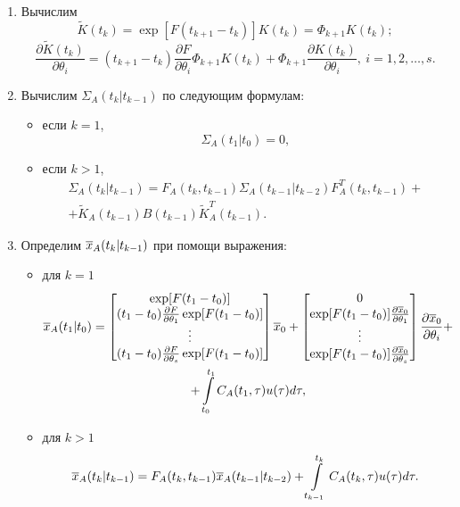 \documentclass[a4paper,14pt]{extarticle}
\newcommand{\pd}[2]{\frac{\partial #1}{\partial #2}}
\begin{document}
\begin{enumerate}
\item Вычислим
\[
	\tilde{K}(t_k) = \exp \left[ F(t_{k+1} - t_k) \right] K(t_k) = \Phi_{k+1}
		K(t_k);
\]
\[
	\pd{\tilde{K}(t_k)}{\theta_i} = (t_{k+1} - t_k) \pd{F}{\theta_i} \Phi_{k+1}
		K(t_k) + \Phi_{k+1} \pd{K(t_k)}{\theta_i},\ i = 1, 2, \ldots, s.
\]

\item Вычислим $\Sigma_A(t_k|t_{k-1})$ по следующим формулам:
	\begin{itemize}
		\item если $k = 1$,
			\[
				\Sigma_A(t_1|t_0) = 0,
			\]
		\item если $k > 1$,
			\begin{multline*}
				\Sigma_A(t_k|t_{k-1}) = F_A(t_k, t_{k-1}) \Sigma_A(t_{k-1}|t_{k-2})
					F_A^T(t_k, t_{k-1}) + \\ + \tilde{K}_A(t_{k-1}) B(t_{k-1})
					\tilde{K}_A^T(t_{k-1}).
			\end{multline*}
	\end{itemize}

\item Определим $\overline{x}_A(t_k|t_{k-1})$ при помощи выражения:
	\begin{itemize}
		\item для $k = 1$
			\begin{multline*}
				\ol{x}_A(t_1|t_{0}) =
				\begin{bmatrix}
					\exp[ F(t_1 - t_0) ] \\
					(t_1 - t_0) \pd{F}{\theta_1} \exp[ F(t_1 - t_0) ] \\
					\vdots \\
					(t_1 - t_0) \pd{F}{\theta_s} \exp[ F(t_1 - t_0) ] \\
				\end{bmatrix}
				\ol{x}_0 +
					\begin{bmatrix}
						0 \\
						\exp [ F(t_1 - t_0) ] \pd{\ol{x}_0}{\theta_1} \\
						\vdots \\
						\exp [ F(t_1 - t_0) ] \pd{\ol{x}_0}{\theta_s} \\
					\end{bmatrix}
					\pd{\ol{x}_0}{\theta_i} + \\ +
					\int\limits_{t_0}^{t_1} C_A(t_1, \tau) u(\tau) d\tau,
				\end{multline*}
		\item для $k > 1$
			\[
				\overline{x}_A(t_k|t_{k-1}) = F_A (t_k, t_{k-1}) \overline{x}_A(t_{k-1}|t_{k-2}) + 
					\int\limits_{t_{k-1}}^{t_k} C_A(t_k, \tau) u(\tau) d\tau.
			\]
	\end{itemize}


\end{enumerate}
\end{document}
